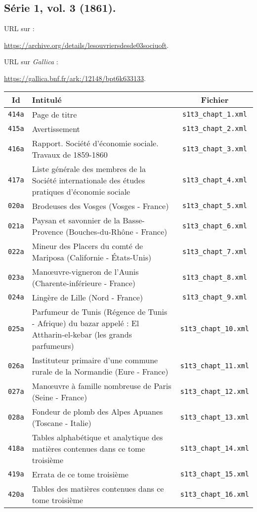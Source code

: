 \subsection{Série 1, vol. 3 (1861).}
\label{mappings1t3}

URL sur \ia{} : 

\url{https://archive.org/details/lesouvriersdesde03sociuoft}.

URL sur \textit{Gallica} : 

\url{https://gallica.bnf.fr/ark:/12148/bpt6k633133}.

\begin{center}
\begin{longtable}{ | c | p{9.5cm} | c | }
\hline
Id & Intitulé & Fichier \\ \hline
\texttt{414a} & Page de titre & \texttt{s1t3\_chapt\_1.xml} \\ \hline
\texttt{415a} & Avertissement & \texttt{s1t3\_chapt\_2.xml} \\ \hline
\texttt{416a} & Rapport. Société d'économie sociale. Travaux de 1859-1860 & \texttt{s1t3\_chapt\_3.xml} \\ \hline
\texttt{417a} & Liste générale des membres de la Société internationale des études pratiques d'économie sociale & \texttt{s1t3\_chapt\_4.xml} \\ \hline
\texttt{020a} & Brodeuses des Vosges (Vosges - France) & \texttt{s1t3\_chapt\_5.xml} \\ \hline
\texttt{021a} & Paysan et savonnier de la Basse-Provence (Bouches-du-Rhône - France) & \texttt{s1t3\_chapt\_6.xml} \\ \hline
\texttt{022a} & Mineur des Placers du comté de Mariposa (Californie - États-Unis) & \texttt{s1t3\_chapt\_7.xml} \\ \hline
\texttt{023a} & Manœuvre-vigneron de l'Aunis (Charente-inférieure - France) & \texttt{s1t3\_chapt\_8.xml} \\ \hline
\texttt{024a} & Lingère de Lille (Nord - France) & \texttt{s1t3\_chapt\_9.xml} \\ \hline
\texttt{025a} & Parfumeur de Tunis (Régence de Tunis - Afrique) du bazar appelé : El Attharin-el-kebar (les grands parfumeurs) & \texttt{s1t3\_chapt\_10.xml} \\ \hline
\texttt{026a} & Instituteur primaire d'une commune rurale de la Normandie (Eure - France) & \texttt{s1t3\_chapt\_11.xml} \\ \hline
\texttt{027a} & Manœuvre à famille nombreuse de Paris (Seine - France) & \texttt{s1t3\_chapt\_12.xml} \\ \hline
\texttt{028a} & Fondeur de plomb des Alpes Apuanes (Toscane - Italie) & \texttt{s1t3\_chapt\_13.xml} \\ \hline
\texttt{418a} & Tables alphabétique et analytique des matières contenues dans ce tome troisième & \texttt{s1t3\_chapt\_14.xml} \\ \hline
\texttt{419a} & Errata de ce tome troisième & \texttt{s1t3\_chapt\_15.xml} \\ \hline
\texttt{420a} & Tables des matières contenues dans ce tome troisième & \texttt{s1t3\_chapt\_16.xml} \\ \hline
\end{longtable}
\end{center}

